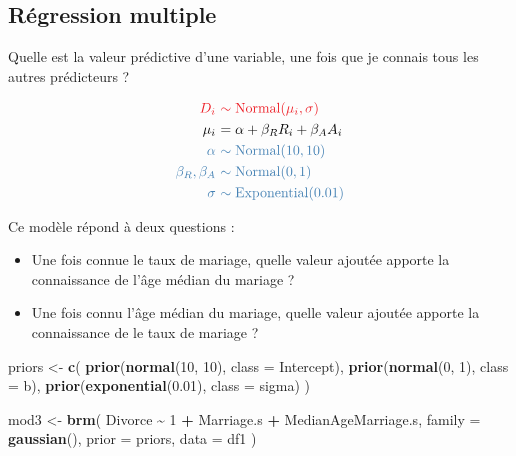 \documentclass[
  a4paper,11pt,twoside,onecolumn,openright,final,oldfontcommands]{memoir}
\newenvironment{Shaded}{\begin{snugshade}}{\end{snugshade}}
\newcommand{\DataTypeTok}[1]{\textcolor[rgb]{0.13,0.29,0.53}{#1}}
\newcommand{\DecValTok}[1]{\textcolor[rgb]{0.00,0.00,0.81}{#1}}
\newcommand{\FloatTok}[1]{\textcolor[rgb]{0.00,0.00,0.81}{#1}}
\newcommand{\KeywordTok}[1]{\textcolor[rgb]{0.13,0.29,0.53}{\textbf{#1}}}
\newcommand{\NormalTok}[1]{#1}
\newcommand{\OperatorTok}[1]{\textcolor[rgb]{0.81,0.36,0.00}{\textbf{#1}}}
\newcommand{\StringTok}[1]{\textcolor[rgb]{0.31,0.60,0.02}{#1}}
\providecommand{\tightlist}{%
  \setlength{\itemsep}{0pt}\setlength{\parskip}{0pt}}
\theoremstyle{definition}
\theoremstyle{definition}
\theoremstyle{definition}
\theoremstyle{remark}
\begin{document}
\hypertarget{ruxe9gression-multiple-1}{%
\subsection{Régression multiple}\label{ruxe9gression-multiple-1}}

Quelle est la valeur prédictive d'une variable, une fois que je connais tous les autres prédicteurs ?

\[
\begin{aligned}
\color{orangered}{D_{i}} \ &\color{orangered}{\sim \mathrm{Normal}(\mu_{i}, \sigma)} \\
\color{black}{\mu_{i}} \ &\color{black}{= \alpha + \beta_{R}R_{i} + \beta_{A} A_{i}} \\
\color{steelblue}{\alpha} \ &\color{steelblue}{\sim \mathrm{Normal}(10, 10)} \\
\color{steelblue}{\beta_{R}, \beta_{A}} \ &\color{steelblue}{\sim \mathrm{Normal}(0, 1)} \\
\color{steelblue}{\sigma} \ &\color{steelblue}{\sim \mathrm{Exponential}(0.01)} \\
\end{aligned}
\]

Ce modèle répond à deux questions :

\begin{itemize}
\tightlist
\item
  Une fois connue le taux de mariage, quelle valeur ajoutée apporte la connaissance de l'âge médian du mariage ?
\item
  Une fois connu l'âge médian du mariage, quelle valeur ajoutée apporte la connaissance de le taux de mariage ?
\end{itemize}

\begin{Shaded}
\begin{Highlighting}[]
\NormalTok{priors \textless{}{-}}\StringTok{ }\KeywordTok{c}\NormalTok{(}
  \KeywordTok{prior}\NormalTok{(}\KeywordTok{normal}\NormalTok{(}\DecValTok{10}\NormalTok{, }\DecValTok{10}\NormalTok{), }\DataTypeTok{class =}\NormalTok{ Intercept),}
  \KeywordTok{prior}\NormalTok{(}\KeywordTok{normal}\NormalTok{(}\DecValTok{0}\NormalTok{, }\DecValTok{1}\NormalTok{), }\DataTypeTok{class =}\NormalTok{ b),}
  \KeywordTok{prior}\NormalTok{(}\KeywordTok{exponential}\NormalTok{(}\FloatTok{0.01}\NormalTok{), }\DataTypeTok{class =}\NormalTok{ sigma)}
\NormalTok{  )}

\NormalTok{mod3 \textless{}{-}}\StringTok{ }\KeywordTok{brm}\NormalTok{(}
\NormalTok{  Divorce }\OperatorTok{\textasciitilde{}}\StringTok{ }\DecValTok{1} \OperatorTok{+}\StringTok{ }\NormalTok{Marriage.s }\OperatorTok{+}\StringTok{ }\NormalTok{MedianAgeMarriage.s,}
  \DataTypeTok{family =} \KeywordTok{gaussian}\NormalTok{(),}
  \DataTypeTok{prior =}\NormalTok{ priors,}
  \DataTypeTok{data =}\NormalTok{ df1}
\NormalTok{  )}
\end{Highlighting}
\end{Shaded}
\end{document}
